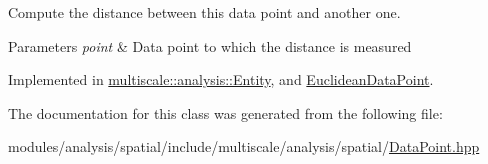 Compute the distance between this data point and another one. 


\begin{DoxyParams}{Parameters}
{\em point} & Data point to which the distance is measured \\
\hline
\end{DoxyParams}


Implemented in \hyperlink{classmultiscale_1_1analysis_1_1Entity_a39cb4bb856c295c82676085d976d58e8}{multiscale\-::analysis\-::\-Entity}, and \hyperlink{classEuclideanDataPoint_a86ac3981ea67375c7854e9d84446f8e5}{Euclidean\-Data\-Point}.



The documentation for this class was generated from the following file\-:\begin{DoxyCompactItemize}
\item 
modules/analysis/spatial/include/multiscale/analysis/spatial/\hyperlink{DataPoint_8hpp}{Data\-Point.\-hpp}\end{DoxyCompactItemize}
